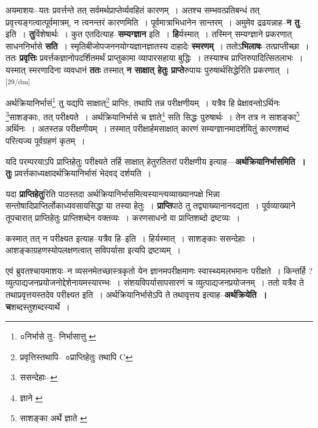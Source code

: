 \documentclass[article,12pt,a4paper]{memoir}
\begin{document}
	  \pstart अयमाशयः--यतः प्रवर्त्तन्ते तत् सर्वमर्थप्राप्तेर्व्यवहितं कारणम् । अतश्च सम्भवत्प्रतिबन्धं तत् प्रवृत्त्यङ्गत्वात्पूर्वमात्रम्, न त्वनन्तरं कारणमिति । पूर्वमात्राभिधानेन सान्तरम् । अमुमेव द्रढयन्नाह--\textbf{न तु}--इति । \textbf{तु}र्विशेषार्थः । कुत एतदित्याह--\textbf{सम्यग्ज्ञान} इति । \textbf{हि}र्यस्मात् । तस्मिन् सम्यग्ज्ञाने प्रकरणात् साधननिर्भासे \textbf{सति} । स्मृतिबीजोपजननयोग्यज्ञानज्ञातस्य दाहादेः \textbf{स्मरणम्} । ततोऽ\textbf{भिलाषः}--तत्प्राप्तीच्छा । ततः \textbf{प्रवृत्तिः} प्रवर्त्तकज्ञानोपदर्शितमर्थं प्राप्तुकामा व्यापारसहाया बुद्धिः । तस्याश्च प्राप्तिरुपादित्सितलाभः । यस्मात् स्मरणादिना व्यवधानं \textbf{ततः} तस्मात् \textbf{न साक्षात् हेतुः प्राप्ते}रुपायः पुरुषार्थसिद्धेरिति प्रकरणात् ।
	\pend
      \leavevmode\textsuperscript{\rmlatinfont\tiny [29/dm]}

	  \pstart अर्थक्रियानिर्भासं\footnote{०निर्भासे तु--\cite{dp-msA} \cite{dp-msC} \cite{dp-edP} \cite{dp-edH} \cite{dp-edN} निर्भासात्तु \cite{dp-msB} \cite{dp-edE} \cite{dp-msD}} तु यद्यपि साक्षात्\footnote{प्रवृत्तिस्तथापि--\cite{dp-msA} \cite{dp-edP} \cite{dp-edH} ०प्राप्तिहेतुः तथापि C} प्राप्तिः, तथापि तन्न परीक्षणीयम् । यत्रैव हि प्रेक्षावन्तोऽर्थिनः \footnote{ससन्देहाः--\cite{dp-msD-n}}साशङ्काः, तत् परीक्ष्यते । अर्थक्रियानिर्भासे च ज्ञाते\footnote{ज्ञाने \cite{dp-msB} \cite{dp-edP} \cite{dp-edH}} सति सिद्धः पुरुषार्थः । तेन तत्र न साशङ्का\footnote{साशङ्का अर्थे ज्ञाते \cite{dp-msA} \cite{dp-edP} \cite{dp-edH}} अर्थिनः । अतस्तन्न परीक्षणीयम् । तस्मात् परीक्षार्हमसाक्षात् कारणं सम्यग्ज्ञानमादर्शयितुं कारणशब्दं परित्यज्य पूर्वग्रहणं कृतम् ।
	\pend
      

	  \pstart यदि परम्परयाऽपि प्राप्तिहेतुः परीक्ष्यते तर्हि साक्षात् हेतुरतितरां परीक्षणीय इत्याह—\textbf{अर्थक्रियानिर्भासमिति । तुः} प्रवर्त्तकाध्यक्षादर्थक्रियानिर्भासं भेदवद् दर्शयति ।
	\pend
      

	  \pstart यदा \textbf{प्राप्तिहेतु}रिति पाठस्तदा अर्थक्रियानिर्भासमित्यस्यान्त्यव्याख्यानपक्षे भिन्ना सन्तोषादिप्राप्तिर्लोकाध्यवसायसिद्धा या तस्या हेतुः । \textbf{प्राप्ति}पाठे तु तद्व्याख्यानानवद्यता । पूर्वव्याख्याने तूपचारात् प्राप्तिहेतुः प्राप्तिशब्देन वक्तव्यः । करणसाधनो वा प्राप्तिशब्दो द्रष्टव्यः ।
	\pend
      

	  \pstart कस्मात् तत् न परीक्ष्यत इत्याह--यत्रैव हि--इति । हिर्यस्मात् । साशङ्काः ससन्देहाः । आशङ्काग्रहणस्योपलक्षणत्वात् सविपर्यासा इत्यपि द्रष्टव्यम् ।
	\pend
      

	  \pstart एवं ब्रुवतश्चायमाशयः--न व्यसनमेतच्छास्त्रकृतो येन ज्ञानमपरीक्षमाणः स्वास्थ्यमलभमानः परीक्षते । किन्तर्हि ? व्युत्पाद्यजनप्रयोजनोद्देशेनायमस्यारम्भः । संशयविपर्यासापसारणं च व्युत्पाद्यजनप्रयोजनम् । ततो यत्रैव ते तथाप्रवृत्तयस्तदेव परीक्ष्यत इति । अर्थक्रियानिर्भासेऽपि ते तथावृत्तय इत्याह--\textbf{अर्थक्रियेति । च}शब्दस्तुशब्दस्यार्थे ।
	\pend
      
\end{document}
